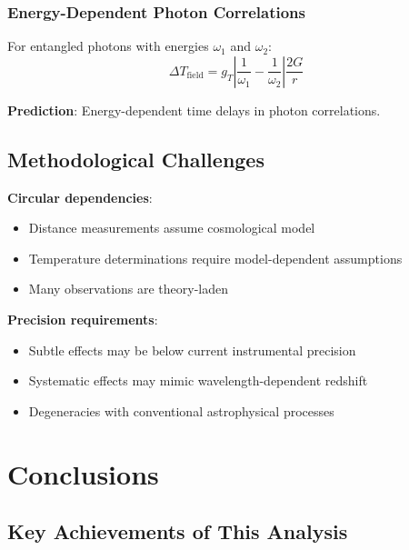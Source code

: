 \documentclass[12pt,a4paper]{article}
\begin{document}
	\subsubsection{Energy-Dependent Photon Correlations}
	\label{subsubsec:photon_correlations}
	
	For entangled photons with energies $\omega_1$ and $\omega_2$:
	\begin{equation}
		\Delta T_{\text{field}} = g_T \left|\frac{1}{\omega_1} - \frac{1}{\omega_2}\right| \frac{2G}{r}
	\end{equation}
	
	\textbf{Prediction}: Energy-dependent time delays in photon correlations.
	
	\subsection{Methodological Challenges}
	\label{subsec:methodological_challenges}
	
	\textbf{Circular dependencies}:
	\begin{itemize}
		\item Distance measurements assume cosmological model
		\item Temperature determinations require model-dependent assumptions
		\item Many observations are theory-laden
	\end{itemize}
	
	\textbf{Precision requirements}:
	\begin{itemize}
		\item Subtle effects may be below current instrumental precision
		\item Systematic effects may mimic wavelength-dependent redshift
		\item Degeneracies with conventional astrophysical processes
	\end{itemize}
	
	\section{Conclusions}
	\label{sec:conclusions}
	
	\subsection{Key Achievements of This Analysis}
	\label{subsec:key_achievements}
	
\end{document}
